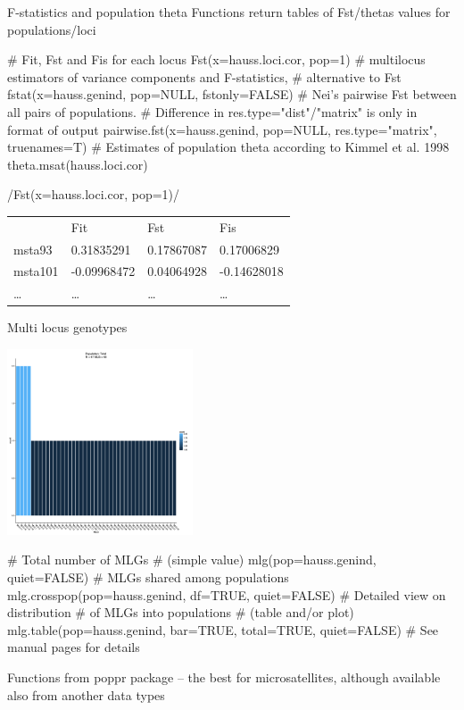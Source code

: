 \documentclass[compress, ucs, xelatex, 11pt, xcolor=svgnames,
  hyperref={
    bookmarks=true,
    unicode=true,
    colorlinks=true,
    pdftitle={Molecular data in R},
    plainpages=false,
    pdfauthor={Vojtech Zeisek},
    pdfsubject={Course about phylogeny and evolution in R},
    pdfcreator={XeLaTeX},
    pdfkeywords={R, evolution, phylogeny, molecular data},
    linkcolor=Tomato,
    anchorcolor=SaddleBrown,
    citecolor=Goldenrod,
    filecolor=DarkMagenta,
    menucolor=Sienna,
    urlcolor=DarkTurquoise,
    pdftex},
  url={hyphens, lowtilde} %
  ]{beamer}
\begin{document}
\begin{frame}[fragile]{F-statistics and population theta}
Functions return tables of Fst/thetas values for populations/loci
  \begin{spluscode}
    # Fit, Fst and Fis for each locus
    Fst(x=hauss.loci.cor, pop=1)
    # multilocus estimators of variance components and F-statistics,
    # alternative to Fst
    fstat(x=hauss.genind, pop=NULL, fstonly=FALSE)
    # Nei's pairwise Fst between all pairs of populations.
    # Difference in res.type="dist"/"matrix" is only in format of output
    pairwise.fst(x=hauss.genind, pop=NULL, res.type="matrix", truenames=T)
    # Estimates of population theta according to Kimmel et al. 1998
    theta.msat(hauss.loci.cor)
  \end{spluscode}
  \splus/Fst(x=hauss.loci.cor, pop=1)/
  \begin{tabular}{llll}
    & Fit & Fst & Fis\\
    msta93 & 0.31835291 & 0.17867087 & 0.17006829\\
    msta101 & -0.09968472 & 0.04064928 & -0.14628018\\
    \ldots & \ldots & \ldots & \ldots
  \end{tabular}
\end{frame}

\begin{frame}[fragile]{Multi locus genotypes}
  \begin{multicols}{2}
  \includegraphics[height=5.5cm]{mlg.png}
  \begin{spluscode}
    # Total number of MLGs
    # (simple value)
    mlg(pop=hauss.genind, quiet=FALSE)
    # MLGs shared among populations
    mlg.crosspop(pop=hauss.genind,
      df=TRUE, quiet=FALSE)
    # Detailed view on distribution
    # of MLGs into populations
    # (table and/or plot)
    mlg.table(pop=hauss.genind,
      bar=TRUE, total=TRUE,
      quiet=FALSE)
    # See manual pages for details
  \end{spluscode}
  \end{multicols}
Functions from poppr package -- the best for microsatellites, although available also from another data types
\end{frame}
\end{document}
